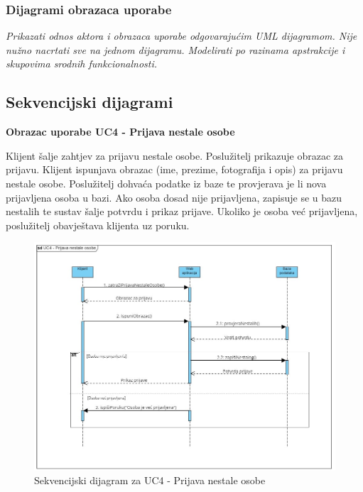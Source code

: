 					
				\subsubsection{Dijagrami obrazaca uporabe}
					
					\textit{Prikazati odnos aktora i obrazaca uporabe odgovarajućim UML dijagramom. Nije nužno nacrtati sve na jednom dijagramu. Modelirati po razinama apstrakcije i skupovima srodnih funkcionalnosti.}
				\eject		
				
				\subsection{Sekvencijski dijagrami}
				
				\textbf{Obrazac uporabe UC4 - Prijava nestale osobe}
    
                Klijent šalje zahtjev za prijavu nestale osobe. Poslužitelj prikazuje obrazac za prijavu. Klijent ispunjava obrazac (ime, prezime, fotografija i opis) za prijavu nestale osobe. Poslužitelj dohvaća podatke iz baze te provjerava je li nova prijavljena osoba u bazi. Ako osoba dosad nije prijavljena, zapisuje se u bazu nestalih te sustav šalje potvrdu i prikaz prijave. Ukoliko je osoba već prijavljena, poslužitelj obavještava klijenta uz poruku.

                \begin{figure}[H] \includegraphics[width=\linewidth]{./dijagrami/PrijavaNestalog.jpg}
				    \caption{Sekvencijski dijagram za UC4 - Prijava nestale osobe}
				    \end{figure}

